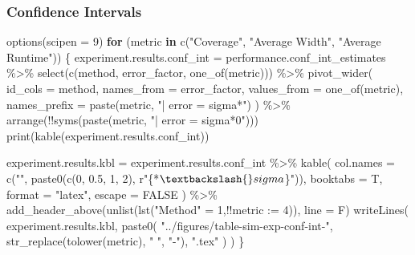 \documentclass[
]{article}
\newenvironment{Shaded}{\begin{snugshade}}{\end{snugshade}}
\newcommand{\AttributeTok}[1]{\textcolor[rgb]{0.77,0.63,0.00}{#1}}
\newcommand{\ConstantTok}[1]{\textcolor[rgb]{0.00,0.00,0.00}{#1}}
\newcommand{\ControlFlowTok}[1]{\textcolor[rgb]{0.13,0.29,0.53}{\textbf{#1}}}
\newcommand{\DecValTok}[1]{\textcolor[rgb]{0.00,0.00,0.81}{#1}}
\newcommand{\FloatTok}[1]{\textcolor[rgb]{0.00,0.00,0.81}{#1}}
\newcommand{\FunctionTok}[1]{\textcolor[rgb]{0.00,0.00,0.00}{#1}}
\newcommand{\NormalTok}[1]{#1}
\newcommand{\OtherTok}[1]{\textcolor[rgb]{0.56,0.35,0.01}{#1}}
\newcommand{\SpecialCharTok}[1]{\textcolor[rgb]{0.00,0.00,0.00}{#1}}
\newcommand{\StringTok}[1]{\textcolor[rgb]{0.31,0.60,0.02}{#1}}
\begin{document}
\hypertarget{confidence-intervals}{%
\subsubsection{Confidence Intervals}\label{confidence-intervals}}

\begin{Shaded}
\begin{Highlighting}[]
\FunctionTok{options}\NormalTok{(}\AttributeTok{scipen =} \DecValTok{9}\NormalTok{)}
\ControlFlowTok{for}\NormalTok{ (metric }\ControlFlowTok{in} \FunctionTok{c}\NormalTok{(}\StringTok{"Coverage"}\NormalTok{, }\StringTok{"Average Width"}\NormalTok{, }\StringTok{"Average Runtime"}\NormalTok{)) \{}
\NormalTok{  experiment.results.conf\_int }\OtherTok{=}\NormalTok{ performance.conf\_int\_estimates }\SpecialCharTok{\%\textgreater{}\%}
    \FunctionTok{select}\NormalTok{(}\FunctionTok{c}\NormalTok{(method, error\_factor, }\FunctionTok{one\_of}\NormalTok{(metric))) }\SpecialCharTok{\%\textgreater{}\%}
    \FunctionTok{pivot\_wider}\NormalTok{(}
      \AttributeTok{id\_cols =}\NormalTok{ method,}
      \AttributeTok{names\_from =}\NormalTok{ error\_factor,}
      \AttributeTok{values\_from =} \FunctionTok{one\_of}\NormalTok{(metric),}
      \AttributeTok{names\_prefix =} \FunctionTok{paste}\NormalTok{(metric, }\StringTok{"| error = sigma*"}\NormalTok{)}
\NormalTok{    ) }\SpecialCharTok{\%\textgreater{}\%}
    \FunctionTok{arrange}\NormalTok{(}\SpecialCharTok{!!}\FunctionTok{syms}\NormalTok{(}\FunctionTok{paste}\NormalTok{(metric, }\StringTok{"| error = sigma*0"}\NormalTok{)))}
  \FunctionTok{print}\NormalTok{(}\FunctionTok{kable}\NormalTok{(experiment.results.conf\_int))}
  
\NormalTok{  experiment.results.kbl }\OtherTok{=}\NormalTok{ experiment.results.conf\_int }\SpecialCharTok{\%\textgreater{}\%}
    \FunctionTok{kable}\NormalTok{(}
      \AttributeTok{col.names =} \FunctionTok{c}\NormalTok{(}\StringTok{""}\NormalTok{, }\FunctionTok{paste0}\NormalTok{(}\FunctionTok{c}\NormalTok{(}\DecValTok{0}\NormalTok{, }\FloatTok{0.5}\NormalTok{, }\DecValTok{1}\NormalTok{, }\DecValTok{2}\NormalTok{), r}\StringTok{"\{*$\textbackslash{}sigma$\}"}\NormalTok{)),}
      \AttributeTok{booktabs =}\NormalTok{ T,}
      \AttributeTok{format =} \StringTok{"latex"}\NormalTok{,}
      \AttributeTok{escape =} \ConstantTok{FALSE}
\NormalTok{    ) }\SpecialCharTok{\%\textgreater{}\%}
    \FunctionTok{add\_header\_above}\NormalTok{(}\FunctionTok{unlist}\NormalTok{(}\FunctionTok{lst}\NormalTok{(}\StringTok{"Method"} \OtherTok{=} \DecValTok{1}\NormalTok{,}\SpecialCharTok{!!}\AttributeTok{metric :=} \DecValTok{4}\NormalTok{)), }\AttributeTok{line =}\NormalTok{ F)}
  \FunctionTok{writeLines}\NormalTok{(}
\NormalTok{    experiment.results.kbl,}
    \FunctionTok{paste0}\NormalTok{(}
      \StringTok{"../figures/table{-}sim{-}exp{-}conf{-}int{-}"}\NormalTok{,}
      \FunctionTok{str\_replace}\NormalTok{(}\FunctionTok{tolower}\NormalTok{(metric), }\StringTok{" "}\NormalTok{, }\StringTok{"{-}"}\NormalTok{),}
      \StringTok{".tex"}
\NormalTok{    )}
\NormalTok{  )}
\NormalTok{\}}
\end{Highlighting}
\end{Shaded}
\end{document}
